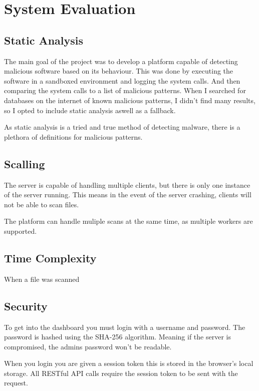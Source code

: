 \chapter{System Evaluation}

\section{Static Analysis}
The main goal of the project was to develop a platform capable of detecting malicious software based on its behaviour.
This was done by executing the software in a sandboxed environment and logging the system calls.
And then comparing the system calls to a list of malicious patterns.
When I searched for databases on the internet of known malicious patterns,
I didn't find many results, so I opted to include static analysis aswell as a fallback.

As static analysis is a tried and true method of detecting malware,
there is a plethora of definitions for malicious patterns.

\section{Scalling}
The server is capable of handling multiple clients, but there is only one instance of the server running.
This means in the event of the server crashing, clients will not be able to scan files.

The platform can handle muliple scans at the same time, as multiple workers are supported.

\section{Time Complexity}
When a file was scanned 

\section{Security}
To get into the dashboard you must login with a username and password.
The password is hashed using the SHA-256 algorithm.
Meaning if the server is compromised, the admins password won't be readable.

When you login you are given a session token this is stored in the browser's local storage.
All RESTful API calls require the session token to be sent with the request.

